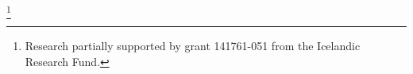 \author[M. Tannock, H. Ulfarsson]{Murray Tannock, Henning Ulfarsson}\thanks{Research partially supported by grant 141761-051 from the Icelandic Research Fund.}
\address{School of Computer Science, Reykjavik University, Reykjavik, Iceland}
